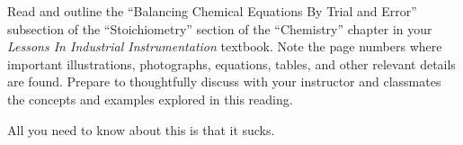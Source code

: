 
Read and outline the ``Balancing Chemical Equations By Trial and Error'' subsection of the ``Stoichiometry'' section of the ``Chemistry'' chapter in your {\it Lessons In Industrial Instrumentation} textbook.  Note the page numbers where important illustrations, photographs, equations, tables, and other relevant details are found.  Prepare to thoughtfully discuss with your instructor and classmates the concepts and examples explored in this reading.













All you need to know about this is that it sucks.





